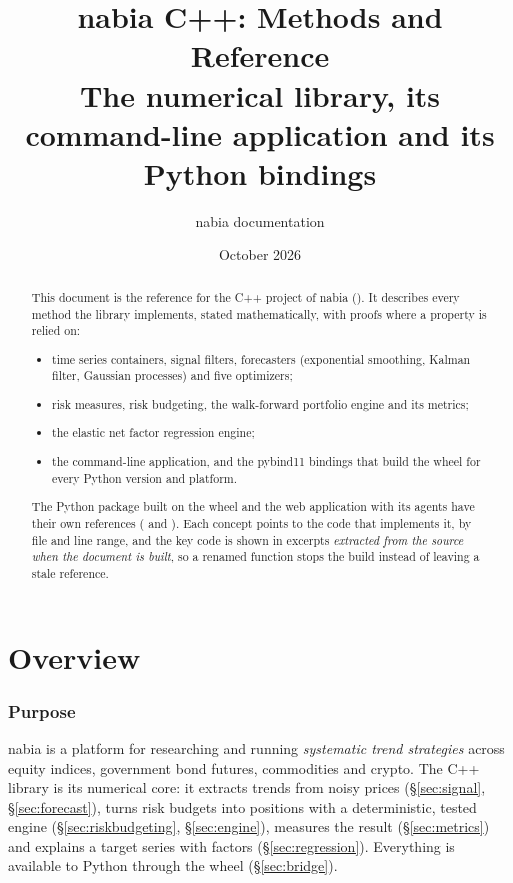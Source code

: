 \documentclass[11pt,a4paper]{article}
\title{nabia C++: Methods and Reference\\[0.3em]
\large The numerical library, its command-line application and its Python bindings}
\author{nabia documentation}
\date{October 2026}
\begin{document}
\maketitle

\begin{abstract}
This document is the reference for the C++ project of nabia (). It describes
every method the library implements, stated mathematically, with proofs where a property is
relied on:
\begin{itemize}
  \item time series containers, signal filters, forecasters (exponential smoothing, Kalman
        filter, Gaussian processes) and five optimizers;
  \item risk measures, risk budgeting, the walk-forward portfolio engine and its metrics;
  \item the elastic net factor regression engine;
  \item the command-line application, and the pybind11 bindings that build the
         wheel for every Python version and platform.
\end{itemize}
The Python package built on the wheel and the web application with its agents have their own
references ( and ). Each concept points to the code that
implements it, by file and line range, and the key code is shown in excerpts \emph{extracted
from the source when the document is built}, so a renamed function stops the build instead of
leaving a stale reference.
\end{abstract}

\tableofcontents
\clearpage
\part{Overview}

\section{Purpose}
nabia is a platform for researching and running \emph{systematic trend strategies} across
equity indices, government bond futures, commodities and crypto. The C++ library is its
numerical core: it extracts trends from noisy prices (\S\ref{sec:signal}, \S\ref{sec:forecast}),
turns risk budgets into positions with a deterministic, tested engine (\S\ref{sec:riskbudgeting},
\S\ref{sec:engine}), measures the result (\S\ref{sec:metrics}) and explains a target series with
factors (\S\ref{sec:regression}). Everything is available to Python through the
 wheel (\S\ref{sec:bridge}).
\end{document}
